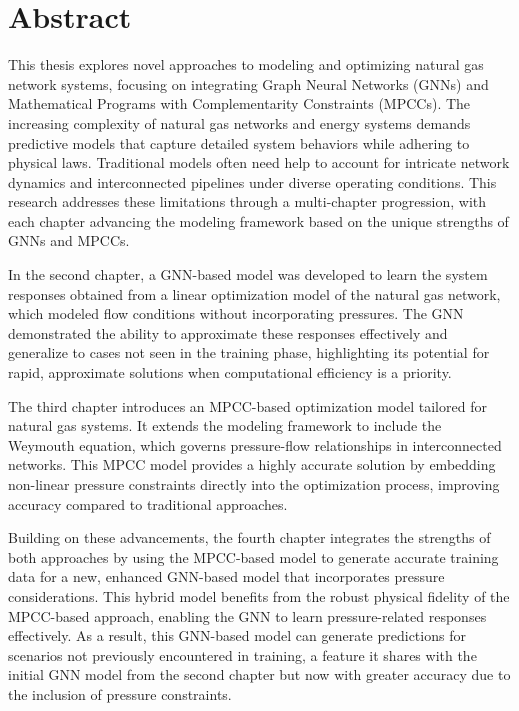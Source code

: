 \chapter*{Abstract} 


This thesis explores novel approaches to modeling and optimizing natural gas network systems, focusing on integrating Graph Neural Networks (GNNs) and Mathematical Programs with Complementarity Constraints (MPCCs). The increasing complexity of natural gas networks and energy systems demands predictive models that capture detailed system behaviors while adhering to physical laws. Traditional models often need help to account for intricate network dynamics and interconnected pipelines under diverse operating conditions. This research addresses these limitations through a multi-chapter progression, with each chapter advancing the modeling framework based on the unique strengths of GNNs and MPCCs.

In the second chapter, a GNN-based model was developed to learn the system responses obtained from a linear optimization model of the natural gas network, which modeled flow conditions without incorporating pressures. The GNN demonstrated the ability to approximate these responses effectively and generalize to cases not seen in the training phase, highlighting its potential for rapid, approximate solutions when computational efficiency is a priority.

The third chapter introduces an MPCC-based optimization model tailored for natural gas systems. It extends the modeling framework to include the Weymouth equation, which governs pressure-flow relationships in interconnected networks. This MPCC model provides a highly accurate solution by embedding non-linear pressure constraints directly into the optimization process, improving accuracy compared to traditional approaches.

Building on these advancements, the fourth chapter integrates the strengths of both approaches by using the MPCC-based model to generate accurate training data for a new, enhanced GNN-based model that incorporates pressure considerations. This hybrid model benefits from the robust physical fidelity of the MPCC-based approach, enabling the GNN to learn pressure-related responses effectively. As a result, this GNN-based model can generate predictions for scenarios not previously encountered in training, a feature it shares with the initial GNN model from the second chapter but now with greater accuracy due to the inclusion of pressure constraints.

